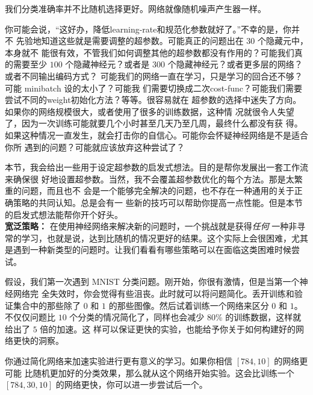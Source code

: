 我们分类准确率并不比随机选择更好。网络就像随机噪声产生器一样。

你可能会说，“这好办，降低\gls*{learning-rate}和规范化参数就好了。”不幸的是，你并不
先验地知道这些就是需要调整的超参数。可能真正的问题出在 $30$ 个隐藏元中，本身就不
能很有效，不管我们如何调整其他的超参数都没有作用的？可能我们真的需要至少 $100$
个隐藏神经元？或者是 $300$ 个隐藏神经元？或者更多层的网络？或者不同输出编码方式？
可能我们的网络一直在学习，只是学习的回合还不够？可能 minibatch 设的太小了？可能我
们需要切换成二次\gls*{cost-func}？可能我们需要尝试不同的\gls*{weight}初始化方法？等等。很容易就在
超参数的选择中迷失了方向。如果你的网络规模很大，或者使用了很多的训练数据，这种情
况就很令人失望了，因为一次训练可能就要几个小时甚至几天乃至几周，最终什么都没有获
得。如果这种情况一直发生，就会打击你的自信心。可能你会怀疑神经网络是不是适合你所
遇到的问题？可能就应该放弃这种尝试了？

本节，我会给出一些用于设定超参数的启发式想法。目的是帮你发展出一套工作流来确保很
好地设置超参数。当然，我不会覆盖超参数优化的每个方法。那是太繁重的问题，而且也不
会是一个能够完全解决的问题，也不存在一种通用的关于正确策略的共同认知。总是会有一
些新的技巧可以帮助你提高一点性能。但是本节的启发式想法能帮你开个好头。\\

\textbf{宽泛策略：} 在使用神经网络来解决新的问题时，一个挑战就是获得\emph{任何}
一种非寻常的学习，也就是说，达到比随机的情况更好的结果。这个实际上会很困难，尤其
是遇到一种新类型的问题时。让我们看看有哪些策略可以在面临这类困难时候尝试。

假设，我们第一次遇到 MNIST 分类问题。刚开始，你很有激情，但是当第一个神经网络完
全失效时，你会觉得有些沮丧。此时就可以将问题简化。丢开训练和验证集合中的那些除了
$0$ 和 $1$ 的那些图像。然后试着训练一个网络来区分 $0$ 和 $1$。不仅仅问题比 $10$
个分类的情况简化了，同样也会减少 80\% 的训练数据，这样就给出了 $5$ 倍的加速。这
样可以保证更快的实验，也能给予你关于如何构建好的网络更快的洞察。

你通过简化网络来加速实验进行更有意义的学习。如果你相信 $[784, 10]$ 的网络更可能
比随机更加好的分类效果，那么就从这个网络开始实验。这会比训练一个 $[784, 30 ,10]$
的网络更快，你可以进一步尝试后一个。

